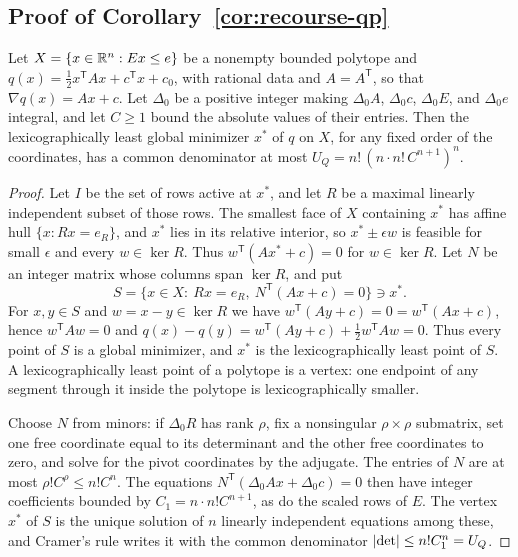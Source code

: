\subsection{Proof of Corollary~\ref{cor:recourse-qp}}
\label{app:recourse-qp}

\begin{lemma}
\label{lem:recourse-qp-height}
Let $X=\{x\in\mathbb R^n:Ex\le e\}$ be a nonempty bounded polytope and
$q(x)=\frac12x^{\mathsf T}Ax+c^{\mathsf T}x+c_0$, with rational data and
$A=A^{\mathsf T}$, so that $\nabla q(x)=Ax+c$. Let
$\Delta_0$ be a positive integer making $\Delta_0A$, $\Delta_0c$,
$\Delta_0E$, and $\Delta_0e$ integral, and let $C\ge1$ bound the
absolute values of their entries. Then the lexicographically least
global minimizer $x^*$ of $q$ on $X$, for any fixed order of the
coordinates, has a common denominator at most
$U_Q=n!\,(n\cdot n!\,C^{n+1})^n$.
\end{lemma}

\begin{proof}
Let $I$ be the set of rows active at $x^*$, and let $R$ be a maximal
linearly independent subset of those rows. The smallest face of $X$
containing $x^*$ has affine hull $\{x:Rx=e_R\}$, and $x^*$ lies in its
relative interior, so $x^*\pm\epsilon w$ is feasible for small
$\epsilon$ and every $w\in\ker R$. Thus $w^{\mathsf T}(Ax^*+c)=0$ for
$w\in\ker R$. Let $N$ be an integer matrix whose columns span $\ker R$,
and put
\[
 S=\{x\in X:\ Rx=e_R,\ N^{\mathsf T}(Ax+c)=0\}\ni x^* .
\]
For $x,y\in S$ and $w=x-y\in\ker R$ we have
$w^{\mathsf T}(Ay+c)=0=w^{\mathsf T}(Ax+c)$, hence $w^{\mathsf T}Aw=0$ and
$q(x)-q(y)=w^{\mathsf T}(Ay+c)+\frac12w^{\mathsf T}Aw=0$. Thus every point
of $S$ is a global minimizer, and $x^*$ is the lexicographically least
point of $S$. A lexicographically least point of a polytope is a
vertex: one endpoint of any segment through it inside the polytope is
lexicographically smaller.

Choose $N$ from minors: if $\Delta_0R$ has rank $\rho$, fix a
nonsingular $\rho\times\rho$ submatrix, set one free coordinate equal to
its determinant and the other free coordinates to zero, and solve for
the pivot coordinates by the adjugate. The entries of $N$ are at most
$\rho!C^\rho\le n!C^n$. The equations $N^{\mathsf T}(\Delta_0Ax+\Delta_0c)=0$
then have integer coefficients bounded by $C_1=n\cdot n!C^{n+1}$, as do
the scaled rows of $E$. The vertex $x^*$ of $S$ is the unique solution
of $n$ linearly independent equations among these, and Cramer's rule
writes it with the common denominator $\left\lvert\det\right\rvert\le n!C_1^n=U_Q$.
\end{proof}

